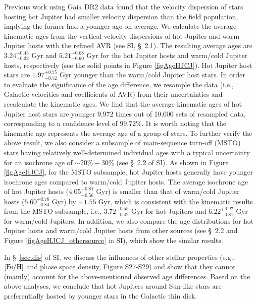 \documentclass[twocolumn]{pnas-new}
\begin{document}
Previous work \citep{2019AJ....158..190H} using Gaia DR2 data found that the velocity dispersion of stars hosting hot Jupiter had smaller velocity dispersion than the field population, implying the former had a younger age on average. 
We calculate the average kinematic ages from the vertical velocity dispersions of hot Jupiter and warm Jupiter hosts with the refined AVR (see SI, \S~2.1). The resulting average ages are $3.24^{+0.43}_{-0.32}$ Gyr and $5.21^{+0.68}_{-0.60}$ Gyr for the hot Jupiter hosts and warm/cold Jupiter hosts, respectively (see the solid points in Figure \ref{figAgeHJCJ}).
Hot Jupiter host stars are $1.97^{+0.75}_{-0.72}$ Gyr younger than the warm/cold Jupiter host stars.
In order to evaluate the significance of the age difference, we resample the data (i.e., Galactic velocities and coefficients of AVR) from their uncertainties and recalculate the kinematic ages.
We find that the average kinematic ages of hot Jupiter host stars are younger 9,972 times out of 10,000 sets of resampled data, corresponding to a confidence level of 99.72\%.
It is worth noting that the kinematic age represents the average age of a group of stars.
To further verify the above result, we also consider a subsample of main-sequence turn-off (MSTO) stars having relatively well-determined individual ages with a typical uncertainty for an isochrone age of $\sim 20\%-30\%$ \citep[e.g.,][]{2017ApJS..232....2X,2004ApJS..155..667D} (see \S~2.2 of SI).
As shown in Figure \ref{figAgeHJCJ}, for the MSTO subsample, hot Jupiter hosts generally have younger isochrone ages compared to warm/cold Jupiter hosts.
The average isochrone age of hot Jupiter hosts ($4.05^{+0.81}_{-0.56}$ Gyr) is smaller than that of warm/cold Jupiter hosts ($5.60^{+0.78}_{-0.84}$ Gyr) by $\sim 1.55$ Gyr, which is consistent with the kinematic results from the MSTO subsample, i.e., $3.72^{+0.55}_{-0.42}$ Gyr for hot Jupiters and $6.22^{+0.97}_{-0.81}$ Gyr for warm/cold Jupiters. 
In addition, we also compare the age distributions for hot Jupiter hosts and warm/cold Jupiter hosts from other sources (see \S~2.2 and Figure \ref{figAgeHJCJ_othersource} in SI), which show the similar results.


In \S~\ref{sec.dis} of SI, we discuss the influences of other stellar properties (e.g., $\rm [Fe/H]$ and phase space density, Figure S27-S29) and show that they cannot (mainly) account for the above-mentioned observed age differences. 
Based on the above analyses, we conclude that hot Jupiters around Sun-like stars are preferentially hosted by younger stars in the Galactic thin disk. \\
\end{document}
